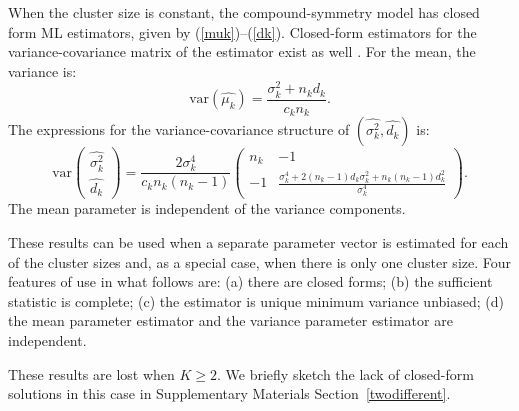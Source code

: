 \documentclass[11pt,a5paper,twoside]{book}
\begin{document}
When the cluster size is constant, the compound-symmetry model has closed form ML estimators, given by (\ref{muk})--(\ref{dk}). Closed-form estimators for the variance-covariance matrix of the estimator exist as well \citep{Iddi2011}. For the mean, the variance is:
\begin{equation}
\label{varexprmuk}
\mbox{var}(\widehat{\mu_k})=\frac{\sigma_k^2+n_kd_k}{c_kn_k}.
\end{equation}
The expressions for the variance-covariance structure of $(\widehat{\sigma^2_k},\widehat{d_k})$ is:
\begin{equation}
\label{varexprsigmakdk}
\mbox{var}\left(\begin{array}{c}\widehat{\sigma^2_k}\\ \widehat{d_k}\end{array}\right)=
\frac{2\sigma^4_k}{c_kn_k(n_k-1)}
\left(
\begin{array}{cc}
n_k&-1\\
-1&\frac{\sigma_k^4+2(n_k-1)d_k\sigma_k^2+n_k(n_k-1)d^2_k}{\sigma_k^4}
\end{array}
\right).
\end{equation}
The mean parameter is independent of the variance components.

These results can be used when a separate parameter vector is estimated for each of the cluster sizes and, as a special case,  when there is only one cluster size. Four features of use in what follows are: (a) there are closed forms; (b) the sufficient statistic is complete; (c) the estimator is unique minimum variance unbiased; (d) the mean parameter estimator and the variance parameter estimator are independent.

These results are lost when $K\ge 2$. We briefly sketch the lack of closed-form solutions in this case in Supplementary Materials Section~\ref{twodifferent}.
\end{document}
